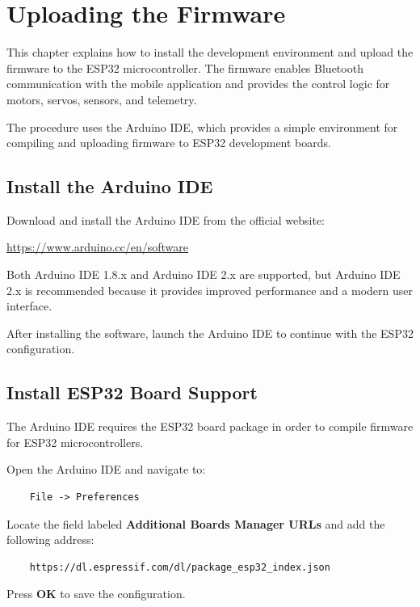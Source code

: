 \chapter{Uploading the Firmware}

This chapter explains how to install the development environment and upload the firmware to the ESP32 microcontroller. The firmware enables Bluetooth communication with the mobile application and provides the control logic for motors, servos, sensors, and telemetry.

The procedure uses the Arduino IDE, which provides a simple environment for compiling and uploading firmware to ESP32 development boards.

\section{Install the Arduino IDE}

Download and install the Arduino IDE from the official website:

\begin{center}
	\url{https://www.arduino.cc/en/software}
\end{center}

Both Arduino IDE 1.8.x and Arduino IDE 2.x are supported, but Arduino IDE 2.x is recommended because it provides improved performance and a modern user interface.

After installing the software, launch the Arduino IDE to continue with the ESP32 configuration.

\section{Install ESP32 Board Support}

The Arduino IDE requires the ESP32 board package in order to compile firmware for ESP32 microcontrollers.

Open the Arduino IDE and navigate to:

\begin{verbatim}
	File -> Preferences
\end{verbatim}

Locate the field labeled \textbf{Additional Boards Manager URLs} and add the following address:

\begin{verbatim}
	https://dl.espressif.com/dl/package_esp32_index.json
\end{verbatim}

Press \textbf{OK} to save the configuration.

